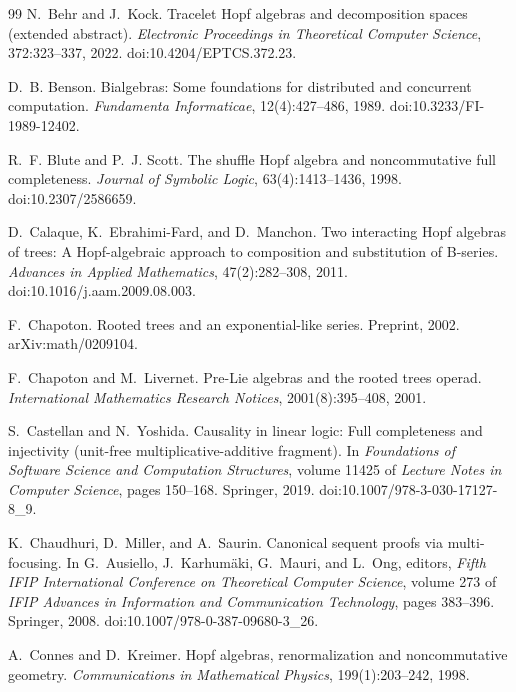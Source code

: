 \documentclass[10pt,a4paper]{article}
\theoremstyle{plain}
\theoremstyle{definition}
\theoremstyle{remark}
\begin{document}
\begin{thebibliography}{99}
N.~Behr and J.~Kock.
\newblock Tracelet Hopf algebras and decomposition spaces (extended
abstract).
\newblock \emph{Electronic Proceedings in Theoretical Computer Science},
372:323--337, 2022.
\newblock doi:10.4204/EPTCS.372.23.

D.~B. Benson.
\newblock Bialgebras: Some foundations for distributed and concurrent
computation.
\newblock \emph{Fundamenta Informaticae}, 12(4):427--486, 1989.
\newblock doi:10.3233/FI-1989-12402.

R.~F. Blute and P.~J. Scott.
\newblock The shuffle Hopf algebra and noncommutative full completeness.
\newblock \emph{Journal of Symbolic Logic}, 63(4):1413--1436, 1998.
\newblock doi:10.2307/2586659.

D.~Calaque, K.~Ebrahimi-Fard, and D.~Manchon.
\newblock Two interacting Hopf algebras of trees: A Hopf-algebraic approach
to composition and substitution of B-series.
\newblock \emph{Advances in Applied Mathematics}, 47(2):282--308, 2011.
\newblock doi:10.1016/j.aam.2009.08.003.

F.~Chapoton.
\newblock Rooted trees and an exponential-like series.
\newblock Preprint, 2002.
\newblock arXiv:math/0209104.

F.~Chapoton and M.~Livernet.
\newblock Pre-Lie algebras and the rooted trees operad.
\newblock \emph{International Mathematics Research Notices},
2001(8):395--408, 2001.

S.~Castellan and N.~Yoshida.
\newblock Causality in linear logic: Full completeness and injectivity
(unit-free multiplicative-additive fragment).
\newblock In \emph{Foundations of Software Science and Computation
Structures}, volume 11425 of \emph{Lecture Notes in Computer Science},
pages 150--168. Springer, 2019.
\newblock doi:10.1007/978-3-030-17127-8\_9.

K.~Chaudhuri, D.~Miller, and A.~Saurin.
\newblock Canonical sequent proofs via multi-focusing.
\newblock In G.~Ausiello, J.~Karhum\"aki, G.~Mauri, and L.~Ong, editors,
\emph{Fifth IFIP International Conference on Theoretical Computer Science},
volume 273 of \emph{IFIP Advances in Information and Communication
Technology}, pages 383--396. Springer, 2008.
\newblock doi:10.1007/978-0-387-09680-3\_26.

A.~Connes and D.~Kreimer.
\newblock Hopf algebras, renormalization and noncommutative geometry.
\newblock \emph{Communications in Mathematical Physics}, 199(1):203--242,
1998.


\end{thebibliography}
\end{document}
